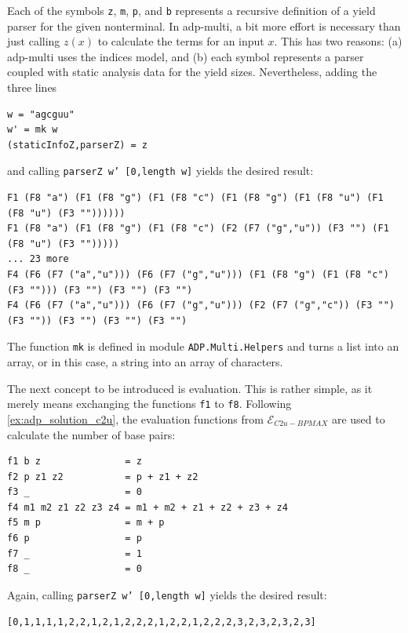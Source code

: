 \documentclass[
    a4paper,
    12pt,
    twoside,
    BCOR=12mm,
    parskip=half,
    chapterprefix,
    numbers=noenddot,
    bibliography=totoc
]{scrbook}
\begin{document}
Each of the symbols \texttt{z}, \texttt{m}, \texttt{p}, and \texttt{b} represents a recursive definition of a yield parser for the given nonterminal. In adp-multi, a bit more effort is necessary than just calling $z(x)$ to calculate the terms for an input $x$. This has two reasons: (a) adp-multi uses the indices model, and (b) each symbol represents a parser coupled with static analysis data for the yield sizes. Nevertheless, adding the three lines

\begin{lstlisting}[name=lst_yield]
w = "agcguu"
w' = mk w
(staticInfoZ,parserZ) = z
\end{lstlisting}

and calling \texttt{parserZ w' [0,length w]} yields the desired result:

\begin{lstlisting}[numbers=none]
F1 (F8 "a") (F1 (F8 "g") (F1 (F8 "c") (F1 (F8 "g") (F1 (F8 "u") (F1 (F8 "u") (F3 ""))))))
F1 (F8 "a") (F1 (F8 "g") (F1 (F8 "c") (F2 (F7 ("g","u")) (F3 "") (F1 (F8 "u") (F3 "")))))
... 23 more
F4 (F6 (F7 ("a","u"))) (F6 (F7 ("g","u"))) (F1 (F8 "g") (F1 (F8 "c") (F3 ""))) (F3 "") (F3 "") (F3 "")
F4 (F6 (F7 ("a","u"))) (F6 (F7 ("g","u"))) (F2 (F7 ("g","c")) (F3 "") (F3 "")) (F3 "") (F3 "") (F3 "")
\end{lstlisting}

The function \texttt{mk} is defined in module \texttt{ADP.Multi.Helpers} and turns a list into an array, or in this case, a string into an array of characters.

The next concept to be introduced is evaluation. This is rather simple, as it merely means exchanging the functions \texttt{f1} to \texttt{f8}. Following \cref{ex:adp_solution_c2u}, the evaluation functions from $\mathcal{E}_{C2u-BPMAX}$ are used to calculate the number of base pairs:

\begin{lstlisting}[caption=Evaluation functions for counting base pairs]
f1 b z               = z
f2 p z1 z2           = p + z1 + z2
f3 _                 = 0
f4 m1 m2 z1 z2 z3 z4 = m1 + m2 + z1 + z2 + z3 + z4
f5 m p               = m + p
f6 p                 = p
f7 _                 = 1
f8 _                 = 0
\end{lstlisting}

Again, calling \texttt{parserZ w' [0,length w]} yields the desired result:

\begin{lstlisting}[numbers=none]
[0,1,1,1,1,2,2,1,2,1,2,2,2,1,2,2,1,2,2,2,3,2,3,2,3,2,3]
\end{lstlisting}
\end{document}
